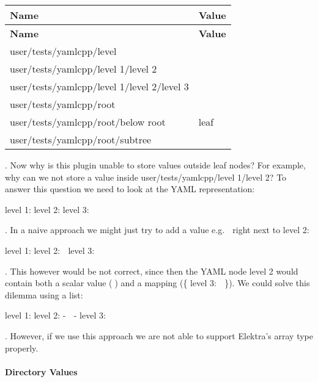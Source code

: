\tabulinesep=1mm
\begin{longtabu} spread 0pt [c]{*{2}{|X[-1]}|}
\hline
\rowcolor{\tableheadbgcolor}\textbf{ Name }&\textbf{ Value  }\\
\endfirsthead
\hline
\endfoot
\hline
\rowcolor{\tableheadbgcolor}\textbf{ Name }&\textbf{ Value  }\\
\endhead
user/tests/yamlcpp/level &\\
user/tests/yamlcpp/level 1/level 2 &\\
user/tests/yamlcpp/level 1/level 2/level 3 &🍁 \\
user/tests/yamlcpp/root &\\
user/tests/yamlcpp/root/below root &leaf \\
user/tests/yamlcpp/root/subtree &🍂 \\
\end{longtabu}
. Now why is this plugin unable to store values outside leaf nodes? For example, why can we not store a value inside {\ttfamily user/tests/yamlcpp/level 1/level 2}? To answer this question we need to look at the Y\+A\+ML representation\+:


\begin{DoxyCode}
level 1:
  level 2:
    level 3:  🍁
\end{DoxyCode}


. In a naive approach we might just try to add a value e.\+g. {\ttfamily 🙈} right next to level 2\+:


\begin{DoxyCode}
level 1:
  level 2: 🙈
    level 3:  🍁
\end{DoxyCode}


. This however would be not correct, since then the Y\+A\+ML node {\ttfamily level 2} would contain both a scalar value ({\ttfamily 🙈}) and a mapping ({\ttfamily \{ level 3\+: 🍁 \}}). We could solve this dilemma using a list\+:


\begin{DoxyCode}
level 1:
  level 2:
    - 🙈
    - level 3:  🍁
\end{DoxyCode}


. However, if we use this approach we are not able to support Elektra’s array type properly.

\paragraph*{Directory Values}

